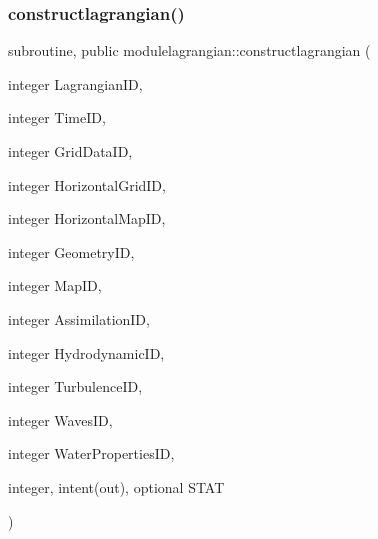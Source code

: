 \subsubsection{\texorpdfstring{constructlagrangian()}{constructlagrangian()}}
{\footnotesize\ttfamily subroutine, public modulelagrangian\+::constructlagrangian (\begin{DoxyParamCaption}\item[{integer}]{Lagrangian\+ID,  }\item[{integer}]{Time\+ID,  }\item[{integer}]{Grid\+Data\+ID,  }\item[{integer}]{Horizontal\+Grid\+ID,  }\item[{integer}]{Horizontal\+Map\+ID,  }\item[{integer}]{Geometry\+ID,  }\item[{integer}]{Map\+ID,  }\item[{integer}]{Assimilation\+ID,  }\item[{integer}]{Hydrodynamic\+ID,  }\item[{integer}]{Turbulence\+ID,  }\item[{integer}]{Waves\+ID,  }\item[{integer}]{Water\+Properties\+ID,  }\item[{integer, intent(out), optional}]{S\+T\+AT }\end{DoxyParamCaption})}

